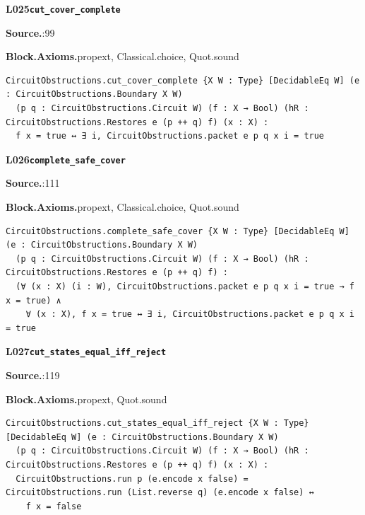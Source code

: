 \par\medskip\noindent\begin{minipage}{\textwidth}
{\small\bfseries L025\enspace\texttt{cut\_cover\_complete}\par}
{\footnotesize\raggedright\textbf{Source.}\enspace{}:99\par
\textbf{Block.}\quad\textbf{Axioms.}\enspace propext, Classical.choice, Quot.sound\par}\nopagebreak
\begin{lstlisting}
CircuitObstructions.cut_cover_complete {X W : Type} [DecidableEq W] (e : CircuitObstructions.Boundary X W)
  (p q : CircuitObstructions.Circuit W) (f : X → Bool) (hR : CircuitObstructions.Restores e (p ++ q) f) (x : X) :
  f x = true ↔ ∃ i, CircuitObstructions.packet e p q x i = true
\end{lstlisting}
\end{minipage}\par

\par\medskip\noindent\begin{minipage}{\textwidth}
{\small\bfseries L026\enspace\texttt{complete\_safe\_cover}\par}
{\footnotesize\raggedright\textbf{Source.}\enspace{}:111\par
\textbf{Block.}\quad\textbf{Axioms.}\enspace propext, Classical.choice, Quot.sound\par}\nopagebreak
\begin{lstlisting}
CircuitObstructions.complete_safe_cover {X W : Type} [DecidableEq W] (e : CircuitObstructions.Boundary X W)
  (p q : CircuitObstructions.Circuit W) (f : X → Bool) (hR : CircuitObstructions.Restores e (p ++ q) f) :
  (∀ (x : X) (i : W), CircuitObstructions.packet e p q x i = true → f x = true) ∧
    ∀ (x : X), f x = true ↔ ∃ i, CircuitObstructions.packet e p q x i = true
\end{lstlisting}
\end{minipage}\par

\par\medskip\noindent\begin{minipage}{\textwidth}
{\small\bfseries L027\enspace\texttt{cut\_states\_equal\_iff\_reject}\par}
{\footnotesize\raggedright\textbf{Source.}\enspace{}:119\par
\textbf{Block.}\quad\textbf{Axioms.}\enspace propext, Quot.sound\par}\nopagebreak
\begin{lstlisting}
CircuitObstructions.cut_states_equal_iff_reject {X W : Type} [DecidableEq W] (e : CircuitObstructions.Boundary X W)
  (p q : CircuitObstructions.Circuit W) (f : X → Bool) (hR : CircuitObstructions.Restores e (p ++ q) f) (x : X) :
  CircuitObstructions.run p (e.encode x false) = CircuitObstructions.run (List.reverse q) (e.encode x false) ↔
    f x = false
\end{lstlisting}
\end{minipage}\par

